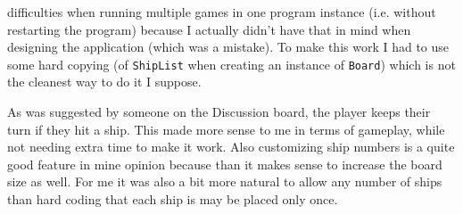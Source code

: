 \documentclass[]{article}
\begin{document}
difficulties when running multiple games in one program instance (i.e. without restarting the program) because I actually didn't have that in mind when designing the application (which was a mistake). To make this work I had to use some hard copying (of \texttt{ShipList} when creating an instance of \texttt{Board}) which is not the cleanest way to do it I suppose.

As was suggested by someone on the Discussion board, the player keeps their turn if they hit a ship. This made more sense to me in terms of gameplay, while not needing extra time to make it work.
Also customizing ship numbers is a quite good feature in mine opinion because than it makes sense to increase the board size as well. For me it was also a bit more natural to allow any number of ships than hard coding that each ship is may be placed only once.
\end{document}
